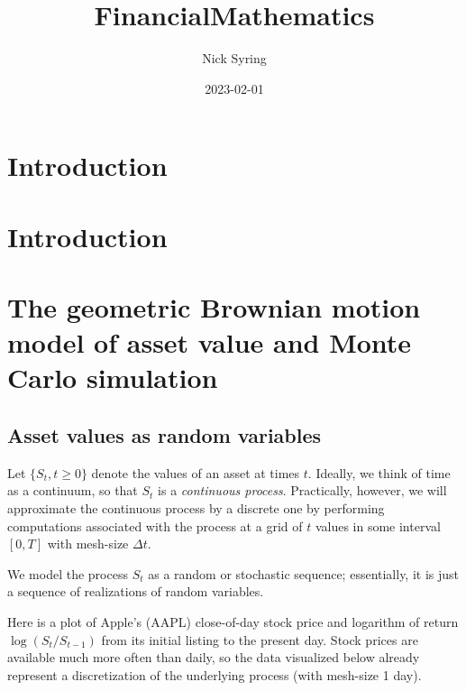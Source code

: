 \documentclass[
]{book}
\title{FinancialMathematics}
\author{Nick Syring}
\date{2023-02-01}
\begin{document}
\maketitle

{
\setcounter{tocdepth}{1}
\tableofcontents
}
\hypertarget{introduction}{%
\chapter{Introduction}\label{introduction}}

\hypertarget{intro}{%
\chapter{Introduction}\label{intro}}

\hypertarget{the-geometric-brownian-motion-model-of-asset-value-and-monte-carlo-simulation}{%
\chapter{The geometric Brownian motion model of asset value and Monte Carlo simulation}\label{the-geometric-brownian-motion-model-of-asset-value-and-monte-carlo-simulation}}

\hypertarget{asset-values-as-random-variables}{%
\section{Asset values as random variables}\label{asset-values-as-random-variables}}

Let \(\{S_t, t\geq 0\}\) denote the values of an asset at times \(t\). Ideally, we think of time as a continuum, so that \(S_t\) is a \emph{continuous process}. Practically, however, we will approximate the continuous process by a discrete one by performing computations associated with the process at a grid of \(t\) values in some interval \([0,T]\) with mesh-size \(\Delta t\).

We model the process \(S_t\) as a random or stochastic sequence; essentially, it is just a sequence of realizations of random variables.

Here is a plot of Apple's (AAPL) close-of-day stock price and logarithm of return \(\log(S_t/S_{t-1})\) from its initial listing to the present day. Stock prices are available much more often than daily, so the data visualized below already represent a discretization of the underlying process (with mesh-size 1 day).
\end{document}
